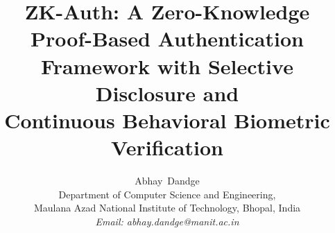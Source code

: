 \documentclass[journal,twoside,10pt]{IEEEtran}
\begin{document}
\title{ZK-Auth: A Zero-Knowledge Proof-Based Authentication\\
Framework with Selective Disclosure and\\
Continuous Behavioral Biometric Verification}

\author{Abhay~Dandge\IEEEmembership{}\\
  Department of Computer Science and Engineering,\\
  Maulana Azad National Institute of Technology, Bhopal, India\\
  \textit{Email: abhay.dandge@manit.ac.in}
}


\maketitle
\end{document}
